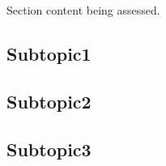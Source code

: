 \begin{notes}

    Section content being assessed.
    
\end{notes}

\subsection{Subtopic1}


\subsection{Subtopic2}


\subsection{Subtopic3}

